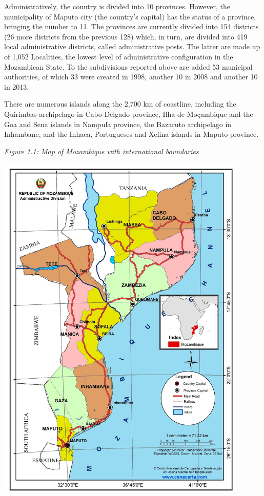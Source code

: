 \documentclass[
]{book}
\begin{document}
Administratively, the country is divided into 10 provinces. However, the municipality of Maputo city (the country's capital) has the status of a province, bringing the number to 11. The provinces are currently divided into 154 districts (26 more districts from the previous 128) which, in turn, are divided into 419 local administrative districts, called administrative posts. The latter are made up of 1,052 Localities, the lowest level of administrative configuration in the Mozambican State. To the subdivisions reported above are added 53 municipal authorities, of which 33 were created in 1998, another 10 in 2008 and another 10 in 2013.

There are numerous islands along the 2,700 km of coastline, including the Quirimbas archipelago in Cabo Delgado province, Ilha de Moçambique and the Goa and Sena islands in Nampula province, the Bazaruto archipelago in Inhambane, and the Inhaca, Portugueses and Xefina islands in Maputo province.

\emph{Figure 1.1: Map of Mozambique with international boundaries}

\includegraphics[width=0.9\textwidth,height=\textheight]{Picture1.png}
\end{document}

